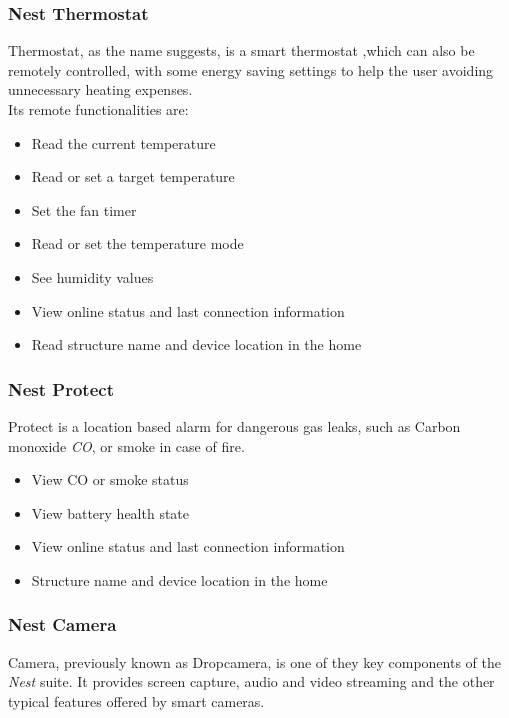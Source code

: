 \subsubsection{Nest Thermostat}
Thermostat, as the name suggests, is a smart thermostat ,which can also be remotely controlled,
with some energy saving settings to help the user avoiding unnecessary heating expenses.   \\
Its remote functionalities are:

\begin{itemize}
    \item Read the current temperature
    \item Read or set a target temperature
    \item Set the fan timer
    \item Read or set the temperature mode
    \item See humidity values
    \item View online status and last connection information
    \item Read structure name and device location in the home
\end{itemize}

\subsubsection{Nest Protect}
Protect is a location based alarm for dangerous gas leaks, such as  Carbon monoxide \textit{CO}, or
smoke in case of fire.

\begin{itemize}
    \item View CO or smoke status
    \item View battery health state
    \item View online status and last connection information
    \item Structure name and device location in the home
\end{itemize}

\subsubsection{Nest Camera}
Camera, previously known as Dropcamera, is one of they key components of the
\textit{Nest} suite. It provides screen capture, audio and video streaming and the
other typical features offered by smart cameras.


